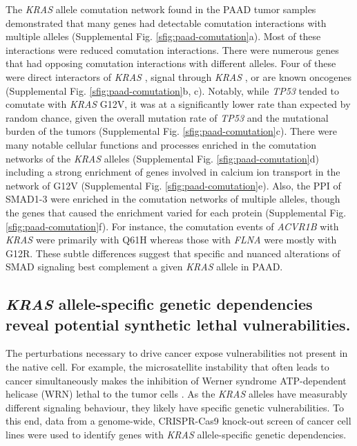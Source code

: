 \documentclass[english, 10pt, letterpaper]{article}
\newcommand{\KRAS}{\emph{KRAS}}
\begin{document}
The \KRAS{} allele comutation network found in the PAAD tumor samples demonstrated that many genes had detectable comutation interactions with multiple alleles (Supplemental Fig. \ref{sfig:paad-comutation}a).
Most of these interactions were reduced comutation interactions.
There were numerous genes that had opposing comutation interactions with different alleles.
Four of these were direct interactors of \KRAS{} \cite{Kovalski2019}, signal through \KRAS{} \cite{Kanehisa2017, Kanehisa2016KEGGAnnotation.}, or are known oncogenes \cite{Bamford2004TheWebsite., Sondka2018} (Supplemental Fig. \ref{sfig:paad-comutation}b, c).
Notably, while \emph{TP53} tended to comutate with \KRAS{} G12V, it was at a significantly lower rate than expected by random chance, given the overall mutation rate of \emph{TP53} and the mutational burden of the tumors (Supplemental Fig. \ref{sfig:paad-comutation}c).
There were many notable cellular functions and processes enriched in the comutation networks of the \KRAS{} alleles (Supplemental Fig. \ref{sfig:paad-comutation}d) including a strong enrichment of genes involved in calcium ion transport in the network of G12V (Supplemental Fig. \ref{sfig:paad-comutation}e).
Also, the PPI of SMAD1-3 were enriched in the comutation networks of multiple alleles, though the genes that caused the enrichment varied for each protein (Supplemental Fig. \ref{sfig:paad-comutation}f).
For instance, the comutation events of \emph{ACVR1B} with \KRAS{} were primarily with Q61H whereas those with \emph{FLNA} were mostly with G12R.
These subtle differences suggest that specific and nuanced alterations of SMAD signaling best complement a given \KRAS{} allele in PAAD.


\subsection*{\KRAS{} allele-specific genetic dependencies reveal potential synthetic lethal vulnerabilities.}

The perturbations necessary to drive cancer expose vulnerabilities not present in the native cell.
For example, the microsatellite instability that often leads to cancer simultaneously makes the inhibition of Werner syndrome ATP-dependent helicase (WRN) lethal to the tumor cells \cite{Behan2019, Chan2019}.
As the \KRAS{} alleles have measurably different signaling behaviour, they likely have specific genetic vulnerabilities.
To this end, data from a genome-wide, CRISPR-Cas9 knock-out screen of cancer cell lines \cite{Tsherniak2017, Meyers2017} were used to identify genes with \KRAS{} allele-specific genetic dependencies.
\end{document}
